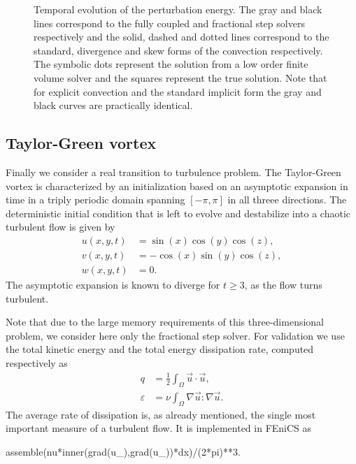 \begin{figure}
 \centering
 \caption{ Temporal evolution of the perturbation energy. The gray and black lines correspond to the fully coupled and fractional step solvers respectively and the solid, dashed and dotted lines correspond to the standard, divergence and skew forms of the convection respectively. The symbolic dots represent the solution from a low order finite volume solver and the squares represent the true solution. Note that for explicit convection and the standard implicit form the gray and black curves are practically identical. }
\label{fig:OS_long_time}
\end{figure}

\subsection{Taylor-Green vortex} 
Finally we consider a real transition to turbulence problem. The Taylor-Green vortex is characterized by an initialization based on an asymptotic expansion in time in a triply periodic domain spanning $[-\pi,\pi]$ in all threee directions. The deterministic initial condition that is left to evolve and destabilize into a chaotic turbulent flow is given by
\begin{align}
 u(x,y,t)&=\sin(x)\cos(y)\cos(z),\\
 v(x,y,t)&=-\cos(x)\sin(y)\cos(z),\\
 w(x,y,t)&=0.
\end{align}
The asymptotic expansion is known to diverge for $t \ge 3$, as the flow turns turbulent.

Note that due to the large memory requirements of this three-dimensional problem, we consider here only the fractional step solver. For validation we use the total kinetic energy and the total energy dissipation rate, computed respectively as
\begin{align}
 q &= \frac{1}{2} \int_{\Omega} \vec{u} \cdot \vec{u}, \label{eq:q} \\
 \varepsilon &= \nu \int_{\Omega} \nabla \vec{u}: \nabla \vec{u}. \label{eq:diss}
\end{align}
The average rate of dissipation is, as already mentioned, the single most important measure of a turbulent flow. It is implemented in FEniCS as
\begin{fenicscode}{0.9}
   assemble(nu*inner(grad(u_),grad(u_))*dx)/(2*pi)**3.
\end{fenicscode}

